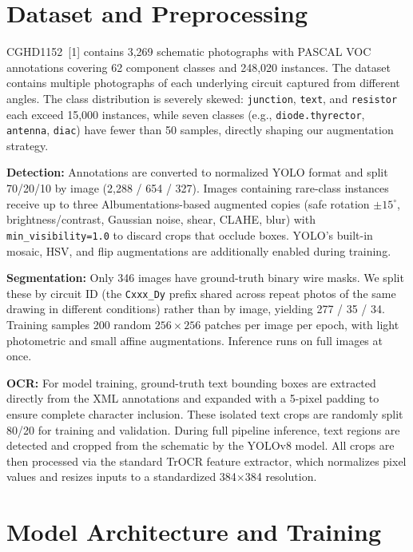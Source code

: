 \documentclass{article}
\begin{document}
\section{Dataset and Preprocessing}

CGHD1152~[1] contains 3{,}269 schematic photographs with PASCAL VOC
annotations covering 62 component classes and 248{,}020
instances. The dataset contains multiple photographs of each underlying
circuit captured from different angles. The class distribution is severely skewed:
\texttt{junction}, \texttt{text}, and \texttt{resistor} each exceed
15{,}000 instances, while seven classes (e.g., \texttt{diode.thyrector},
\texttt{antenna}, \texttt{diac}) have fewer than 50 samples, directly
shaping our augmentation strategy.

\textbf{Detection:} Annotations are converted to normalized YOLO format
and split 70/20/10 by image (2{,}288 / 654 / 327). Images containing
rare-class instances receive up to three Albumentations-based augmented
copies (safe rotation $\pm15^\circ$, brightness/contrast, Gaussian
noise, shear, CLAHE, blur) with \texttt{min\_visibility=1.0} to discard
crops that occlude boxes. YOLO's built-in mosaic, HSV, and flip
augmentations are additionally enabled during training.

\textbf{Segmentation:} Only 346 images have ground-truth binary wire
masks. We split these by circuit ID (the \texttt{Cxxx\_Dy} prefix shared
across repeat photos of the same drawing in different conditions) rather than by image, yielding
277 / 35 / 34. Training samples 200 random $256{\times}256$ patches per
image per epoch, with light photometric and small affine augmentations.
Inference  runs on full images at once.

\textbf{OCR:} For model training, ground-truth text bounding boxes are extracted directly from the XML annotations and expanded with a 5-pixel padding to ensure complete character inclusion. These isolated text crops are randomly split 80/20 for training and validation. During full pipeline inference, text regions are  detected and cropped from the schematic by the YOLOv8 model. All crops are then processed via the standard TrOCR feature extractor, which normalizes pixel values and resizes inputs to a standardized 384×384 resolution. 


\section{Model Architecture and Training}
\end{document}
